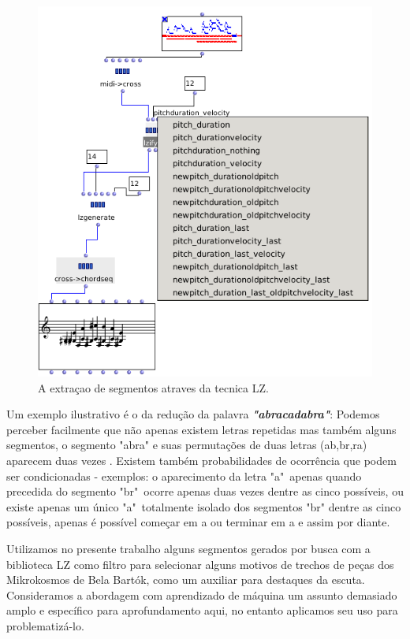\documentclass[
	12pt,				%
	openright,			%
	twoside,			%
	a4paper,			%
	english,			%
	french,				%
	spanish,			%
	brazil				%
	]{abntex2}
\begin{document}
\begin{figure}[!h]
	\caption{\label{fig_grafico}A extraçao de segmentos atraves da tecnica LZ. }
	\begin{center}
	    \includegraphics[scale=0.55]{OM_settheory/LZfy.png}
	\end{center}
\end{figure}



Um exemplo ilustrativo é o da redução da palavra \textbf{\textit{"abracadabra"}}: Podemos perceber facilmente que não apenas existem letras repetidas mas também alguns segmentos, o segmento "abra" e suas permutações de duas letras (ab,br,ra) aparecem duas vezes . Existem também probabilidades de ocorrência que podem ser condicionadas - exemplos: o aparecimento da letra "a"\ apenas quando precedida do segmento "br"\ ocorre apenas duas vezes dentre as cinco possíveis, ou existe apenas um único "a"\ totalmente isolado dos segmentos "br" dentre as cinco possíveis, apenas é possível começar em a ou terminar em a e assim por diante.

Utilizamos no presente trabalho alguns segmentos gerados por busca com a biblioteca LZ como filtro para selecionar alguns motivos de trechos de peças dos Mikrokosmos de Bela Bartók, como um auxiliar para destaques da escuta. Consideramos a abordagem com aprendizado de máquina um assunto demasiado amplo e específico para aprofundamento aqui, no entanto aplicamos seu uso para problematizá-lo.
\end{document}
